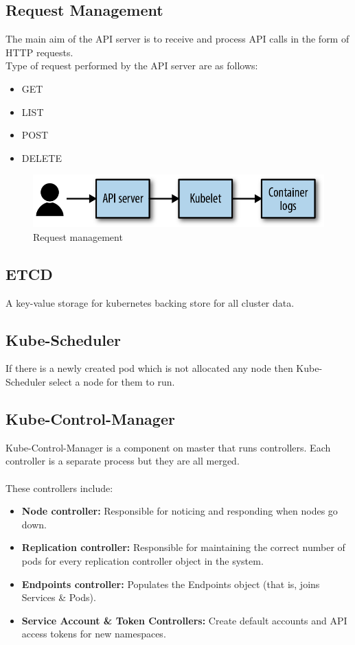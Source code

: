 \documentclass[12pt]{report}
\begin{document}
\subsection{Request Management}
The main aim of the API server is to receive and process API calls in the form of HTTP requests.\\
Type of request performed by the API server are as follows:
\begin{itemize}
	\item GET
	\item LIST
	\item POST
	\item DELETE
\end{itemize}
\begin{figure}[h!]
	\begin{center}
		\includegraphics[totalheight=0.1\textheight]{kubereqman}
		\caption{Request management \cite{Request}}
	\end{center}
\end{figure}
\subsection{ETCD}
A key-value storage for kubernetes backing store for all cluster data.
\subsection{Kube-Scheduler}
If there is a newly created pod which is not allocated any node then Kube-Scheduler select a node for them to run.
\subsection{Kube-Control-Manager}
Kube-Control-Manager is a component on master that runs controllers.
Each controller is a separate process but they are all merged.\\\\
These controllers include:
\begin{itemize}
	\item \textbf{Node controller:} Responsible for noticing and responding when nodes go down.
	\item \textbf{Replication controller:} Responsible for maintaining the correct number of pods for every replication controller object in the system.
	\item \textbf{Endpoints controller:} Populates the Endpoints object (that is, joins Services \& Pods).
	\item \textbf{Service Account \& Token Controllers:} Create default accounts and API access tokens for new namespaces.
\end{itemize}
\end{document}
